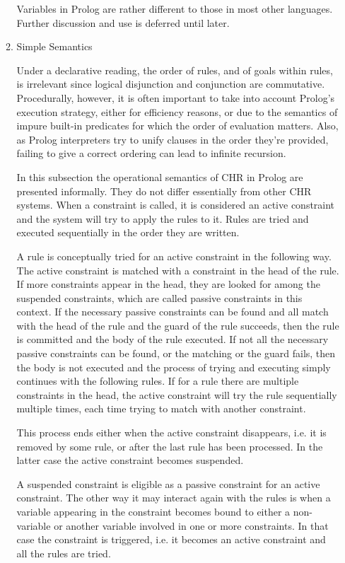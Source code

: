 \documentclass[thesis-solanki.tex]{subfiles}
\begin{document}
\begin{enumerate}
\begin{enumerate}
Variables in Prolog are rather different to those in most other languages. Further discussion and use is deferred until later.




\item Simple Semantics

Under a declarative reading, the order of rules, and of goals within rules, is irrelevant since logical disjunction and conjunction are 
commutative. Procedurally, however, it is often important to take into account Prolog's execution strategy, either for efficiency reasons, 
or due to the semantics of impure built-in predicates for which the order of evaluation matters. Also, as Prolog interpreters try to unify 
clauses in the order they're provided, failing to give a correct ordering can lead to infinite recursion.


In this subsection the operational semantics of CHR in Prolog are presented informally. They do not differ essentially from other CHR systems.
When a constraint is called, it is considered an active constraint and the system will try to apply the rules to it. Rules are tried and executed sequentially in the order they are written.

\cite{website:swiprologsyntaxandsemantics}

A rule is conceptually tried for an active constraint in the following way. The active constraint is matched with a constraint in the head of the rule. If more constraints appear in the head, they are looked for among the suspended constraints, which are called passive constraints in this context. If the necessary passive constraints can be found and all match with the head of the rule and the guard of the rule succeeds, then the rule is committed and the body of the rule executed. If not all the necessary passive constraints can be found, or the matching or the guard fails, then the body is not executed and the process of trying and executing simply continues with the following rules. If for a rule there are multiple constraints in the head, the active constraint will try the rule sequentially multiple times, each time trying to match with another constraint.

This process ends either when the active constraint disappears, i.e. it is removed by some rule, or after the last rule has been processed. In the latter case the active constraint becomes suspended.

A suspended constraint is eligible as a passive constraint for an active constraint. The other way it may interact again with the rules is when a variable appearing in the constraint becomes bound to either a non-variable or another variable involved in one or more constraints. In that case the constraint is triggered, i.e. it becomes an active constraint and all the rules are tried.
\begin{enumerate}


\end{enumerate}
\end{enumerate}
\end{enumerate}
\end{document}

